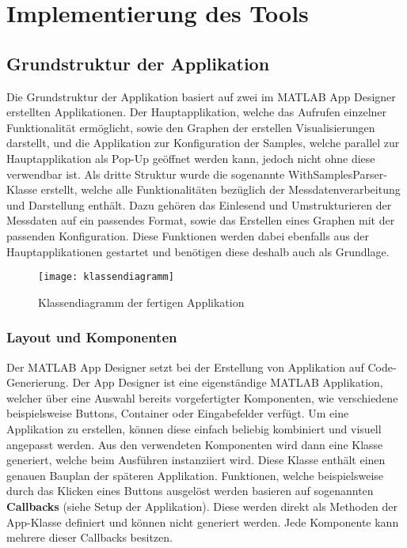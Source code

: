 
\chapter{Implementierung des Tools}

\section{Grundstruktur der Applikation}

Die Grundstruktur der Applikation basiert auf zwei im MATLAB App Designer erstellten Applikationen. Der Hauptapplikation, welche das Aufrufen einzelner Funktionalität ermöglicht, sowie den Graphen der erstellen Visualisierungen darstellt, und die Applikation zur Konfiguration der Samples, welche parallel zur Hauptapplikation als Pop-Up geöffnet werden kann, jedoch nicht ohne diese verwendbar ist. Als dritte Struktur wurde die sogenannte WithSamplesParser-Klasse erstellt, welche alle Funktionalitäten bezüglich der Messdatenverarbeitung und Darstellung enthält. Dazu gehören das Einlesend und Umstrukturieren der Messdaten auf ein passendes Format, sowie das Erstellen eines Graphen mit der passenden Konfiguration. Diese Funktionen werden dabei ebenfalls aus der Hauptapplikationen gestartet und benötigen diese deshalb auch als Grundlage.

\begin{figure}[!htbp]
	\centering
	\texttt{[image: klassendiagramm]}
	\caption{Klassendiagramm der fertigen Applikation}
	\label{fig:klassendiagramm}
\end{figure}

\subsection{Layout und Komponenten}

Der MATLAB App Designer setzt bei der Erstellung von Applikation auf Code-Generierung. Der App Designer ist eine eigenständige MATLAB Applikation, welcher über eine Auswahl bereits vorgefertigter Komponenten, wie verschiedene beispielsweise Buttons, Container oder Eingabefelder verfügt. Um eine Applikation zu erstellen, können diese einfach beliebig kombiniert und visuell angepasst werden. Aus den verwendeten Komponenten wird dann eine Klasse generiert, welche beim Ausführen instanziiert wird. Diese Klasse enthält einen genauen \glqq Bauplan\grqq{} der späteren Applikation. Funktionen, welche beispielsweise durch das Klicken eines Buttons ausgelöst werden basieren auf sogenannten \textbf{Callbacks} (siehe Setup der Applikation). Diese werden direkt als Methoden der App-Klasse definiert und können nicht generiert werden. Jede Komponente kann mehrere dieser Callbacks besitzen.

